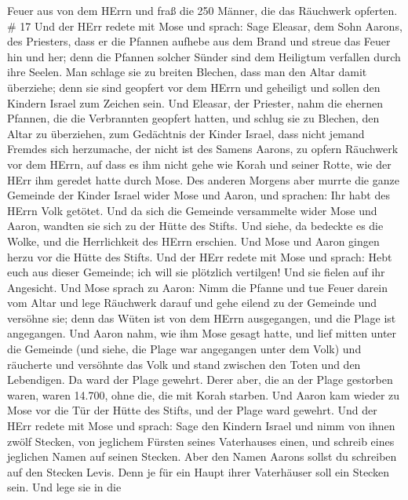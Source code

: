 Feuer aus von dem HErrn und fraß die 250 Männer, die das Räuchwerk
opferten. \# 17  Und der HErr redete mit Mose und sprach:
 Sage Eleasar, dem Sohn Aarons, des Priesters, dass er die
Pfannen aufhebe aus dem Brand und streue das Feuer hin und her;
 denn die Pfannen solcher Sünder sind dem Heiligtum
verfallen durch ihre Seelen. Man schlage sie zu breiten Blechen, dass
man den Altar damit überziehe; denn sie sind geopfert vor dem HErrn und
geheiligt und sollen den Kindern Israel zum Zeichen sein. 
Und Eleasar, der Priester, nahm die ehernen Pfannen, die die Verbrannten
geopfert hatten, und schlug sie zu Blechen, den Altar zu überziehen,
 zum Gedächtnis der Kinder Israel, dass nicht jemand Fremdes
sich herzumache, der nicht ist des Samens Aarons, zu opfern Räuchwerk
vor dem HErrn, auf dass es ihm nicht gehe wie Korah und seiner Rotte,
wie der HErr ihm geredet hatte durch Mose.  Des anderen
Morgens aber murrte die ganze Gemeinde der Kinder Israel wider Mose und
Aaron, und sprachen: Ihr habt des HErrn Volk getötet.  Und
da sich die Gemeinde versammelte wider Mose und Aaron, wandten sie sich
zu der Hütte des Stifts. Und siehe, da bedeckte es die Wolke, und die
Herrlichkeit des HErrn erschien.  Und Mose und Aaron gingen
herzu vor die Hütte des Stifts.  Und der HErr redete mit
Mose und sprach:  Hebt euch aus dieser Gemeinde; ich will
sie plötzlich vertilgen! Und sie fielen auf ihr Angesicht. 
Und Mose sprach zu Aaron: Nimm die Pfanne und tue Feuer darein vom Altar
und lege Räuchwerk darauf und gehe eilend zu der Gemeinde und versöhne
sie; denn das Wüten ist von dem HErrn ausgegangen, und die Plage ist
angegangen.  Und Aaron nahm, wie ihm Mose gesagt hatte, und
lief mitten unter die Gemeinde (und siehe, die Plage war angegangen
unter dem Volk) und räucherte und versöhnte das Volk  und
stand zwischen den Toten und den Lebendigen. Da ward der Plage gewehrt.
 Derer aber, die an der Plage gestorben waren, waren
14.700, ohne die, die mit Korah starben.  Und Aaron kam
wieder zu Mose vor die Tür der Hütte des Stifts, und der Plage ward
gewehrt.  Und der HErr redete mit Mose und sprach:
 Sage den Kindern Israel und nimm von ihnen zwölf Stecken,
von jeglichem Fürsten seines Vaterhauses einen, und schreib eines
jeglichen Namen auf seinen Stecken.  Aber den Namen Aarons
sollst du schreiben auf den Stecken Levis. Denn je für ein Haupt ihrer
Vaterhäuser soll ein Stecken sein.  Und lege sie in die
